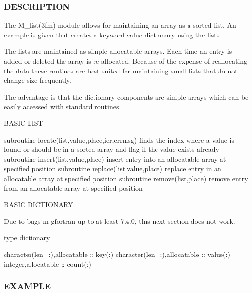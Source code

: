 \subsubsection*{D\+E\+S\+C\+R\+I\+P\+T\+I\+ON}

\begin{DoxyVerb}The M_list(3fm) module allows for maintaining an array as a sorted
list. An example is given that creates a keyword-value dictionary
using the lists.

The lists are maintained as simple allocatable arrays. Each time an
entry is added or deleted the array is re-allocated. Because of the
expense of reallocating the data these routines are best suited for
maintaining small lists that do not change size frequently.

The advantage is that the dictionary components are simple arrays
which can be easily accessed with standard routines.

BASIC LIST

subroutine locate(list,value,place,ier,errmsg)  finds the index where a
                                                value is found or should
                                                be in a sorted array and
                                                flag if the value exists
                                                already
subroutine insert(list,value,place)     insert entry into an allocatable
                                        array at specified position
subroutine replace(list,value,place)    replace entry in an allocatable
                                        array at specified position
subroutine remove(list,place)           remove entry from an allocatable
                                        array at specified position

BASIC DICTIONARY

Due to bugs in gfortran up to at least 7.4.0, this next section
does not work.

type dictionary

   character(len=:),allocatable :: key(:)
   character(len=:),allocatable :: value(:)
   integer,allocatable          :: count(:)

\end{DoxyVerb}


\subsubsection*{E\+X\+A\+M\+P\+LE}

